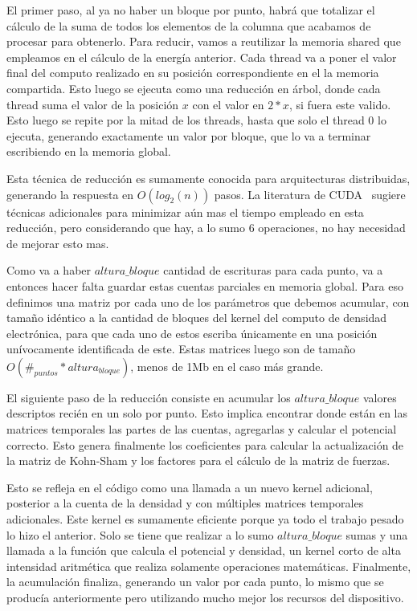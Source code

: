 El primer paso, al ya no haber un bloque por punto, habr\'a que totalizar el c\'alculo de la
suma de todos los elementos de la columna que acabamos de procesar para obtenerlo. Para reducir,
vamos a reutilizar la memoria shared que empleamos en el c\'alculo de la energ\'ia anterior. Cada
thread va a poner el valor final del computo realizado en su posici\'on correspondiente en el
la memoria compartida. Esto luego se ejecuta como una reducci\'on en \'arbol, donde cada
thread suma el valor de la posici\'on $x$ con el valor en $2*x$, si fuera este valido. Esto
luego se repite por la mitad de los threads, hasta que solo el thread 0 lo ejecuta,
generando exactamente un valor por bloque, que lo va a terminar escribiendo en la memoria
global.

Esta t\'ecnica de reducci\'on es sumamente conocida para arquitecturas distribuidas, generando
la respuesta en $O(log_2(n))$ pasos. La literatura de CUDA~\cite{cudaReductions} sugiere t\'ecnicas adicionales para
minimizar a\'un mas el tiempo empleado en esta reducci\'on, pero considerando que hay, a lo sumo
6 operaciones, no hay necesidad de mejorar esto mas.

Como va a haber $altura\_{bloque}$ cantidad de escrituras para cada punto, va a entonces
hacer falta guardar estas cuentas parciales en memoria global. Para eso definimos una matriz
por cada uno de los par\'ametros que debemos acumular, con tama\~no id\'entico a la cantidad de bloques
del kernel del computo de densidad electr\'onica, para que cada uno de estos escriba \'unicamente en una posici\'on
un\'ivocamente identificada de este. Estas matrices luego son de tama\~no $O(\#_{puntos} * altura_{bloque})$,
menos de 1Mb en el caso m\'as grande.

El siguiente paso de la reducci\'on consiste en acumular los $altura\_{bloque}$ valores descriptos
reci\'en en un solo por punto. Esto implica encontrar donde est\'an en las matrices temporales las
partes de las cuentas, agregarlas y calcular el potencial correcto. Esto genera finalmente los
coeficientes para calcular la actualizaci\'on de la matriz de Kohn-Sham y los factores para el
c\'alculo de la matriz de fuerzas.

Esto se refleja en el c\'odigo como una llamada a un nuevo kernel adicional, posterior a la
cuenta de la densidad y con m\'ultiples matrices temporales adicionales. Este kernel es sumamente
eficiente porque ya todo el trabajo pesado lo hizo el anterior. Solo se tiene que realizar
a lo sumo $altura\_{bloque}$ sumas y una llamada a la funci\'on que calcula el potencial y densidad,
un kernel corto de alta intensidad aritm\'etica que realiza solamente operaciones matem\'aticas.
Finalmente, la acumulaci\'on finaliza, generando un valor por cada punto, lo mismo que se produc\'ia
anteriormente pero utilizando mucho mejor los recursos del dispositivo.


